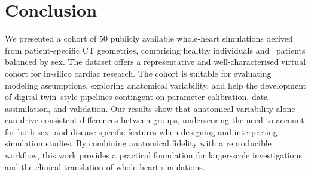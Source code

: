 \section{Conclusion}
We presented a cohort of 50 publicly available whole-heart simulations derived from patient-specific 
CT geometries, comprising healthy individuals and \HF\ patients balanced by sex.
The dataset offers a representative and well-characterised virtual cohort for in-silico cardiac research.
The cohort is suitable for evaluating modeling assumptions, exploring anatomical variability, and 
help the development of digital-twin–style pipelines contingent on parameter calibration, 
data assimilation, and validation.
Our results show that anatomical variability alone can drive consistent differences between groups, 
underscoring the need to account for both sex- and disease-specific features when designing and 
interpreting simulation studies.
By combining anatomical fidelity with a reproducible workflow, this work provides a practical foundation 
for larger-scale investigations and the clinical translation of whole-heart simulations.